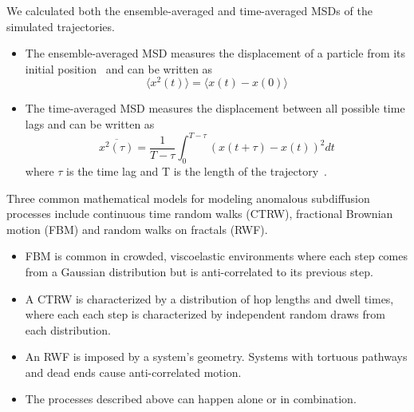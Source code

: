 \documentclass{article}
\begin{document}
  \noindent We calculated both the ensemble-averaged and time-averaged MSDs
  of the simulated trajectories.
  \begin{itemize}
	\item The ensemble-averaged MSD measures the displacement of a particle from its initial
	position~\cite{meroz_toolbox_2015} and can be written as
	\begin{equation}
	\langle x^2(t) \rangle = \langle x(t) - x(0) \rangle
	\label{eqn:ensemble_msd}
	\end{equation}
	\item The time-averaged MSD measures the displacement between all possible time lags
	and can be written as
	\begin{equation}
	\overline{x^2(\tau)} = \dfrac{1}{T - \tau}\int_{0}^{T - \tau} (x(t + \tau) - x(t))^2 dt
	\end{equation}
	where $\tau$ is the time lag and T is the length of the
	trajectory~\cite{meroz_toolbox_2015}. 
  \end{itemize}
  
  \noindent Three common mathematical models for modeling anomalous subdiffusion processes include 
  continuous time random walks (CTRW), fractional Brownian motion (FBM) and
  random walks on fractals (RWF).\cite{meroz_toolbox_2015}
  \begin{itemize}
    \item FBM is common in crowded, viscoelastic environments where each step comes 
    from a Gaussian distribution but is anti-correlated to its previous 
    step.~\cite{mandelbrot_fractional_1968,jeon_fractional_2010,banks_anomalous_2005}
    \item A CTRW is characterized by a distribution of hop lengths and 
    dwell times, where each each step is characterized by independent random draws from 
    each distribution.\cite{montroll_random_1965,morrin_three_2018}
    \item An RWF is imposed by a system's geometry. Systems with tortuous pathways and dead
    ends cause anti-correlated motion.\cite{meroz_toolbox_2015,neusius_subdiffusion_2008}
    \item The processes described above can happen alone or in combination.  	
  \end{itemize}
  
\end{document}
